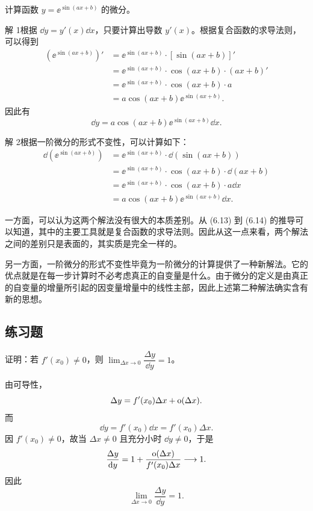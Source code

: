 \begin{xexample}[6.3.3]
计算函数 $y=\ee^{\sin(ax+b)}$ 的微分。
\end{xexample}
\begin{xsolution}
解 1\quad 根据 $\dd y=y'(x)\dd x$，只要计算出导数 $y'(x)$。根据复合函数的求导法则，可以得到
\begin{align*}
  (\ee^{\sin(ax+b)})'
  &=\ee^{\sin(ax+b)}\cdot[\sin(ax+b)]'\\
  &=\ee^{\sin(ax+b)}\cdot\cos(ax+b)\cdot(ax+b)'\\
  &=\ee^{\sin(ax+b)}\cdot\cos(ax+b)\cdot a\\
  &=a\cos(ax+b)\ee^{\sin(ax+b)}.
\end{align*}
因此有
\[
  \dd y=a\cos(ax+b)\ee^{\sin(ax+b)}\dd x.
\]

解 2\quad 根据一阶微分的形式不变性，可以计算如下：
\begin{align*}
  \dd(\ee^{\sin(ax+b)})
  &=\ee^{\sin(ax+b)}\cdot\dd(\sin(ax+b))\\
  &=\ee^{\sin(ax+b)}\cdot\cos(ax+b)\cdot\dd(ax+b)\\
  &=\ee^{\sin(ax+b)}\cdot\cos(ax+b)\cdot a\dd x\\
  &=a\cos(ax+b)\ee^{\sin(ax+b)}\dd x.
\end{align*}
\end{xsolution}

\begin{xremark}
一方面，可以认为这两个解法没有很大的本质差别。从 (6.13) 到 (6.14) 的推导可以知道，其中的主要工具就是复合函数的求导法则。因此从这一点来看，两个解法之间的差别只是表面的，其实质是完全一样的。

另一方面，一阶微分的形式不变性毕竟为一阶微分的计算提供了一种新解法。它的优点就是在每一步计算时不必考虑真正的自变量是什么。由于微分的定义是由真正的自变量的增量所引起的因变量增量中的线性主部，因此上述第二种解法确实含有新的思想。
\end{xremark}

\subsection{练习题}

\begin{xexercise}[1]
证明：若 $f'(x_0)\ne0$，则 $\lim_{\Delta x\to0}\dfrac{\Delta y}{\dd y}=1$。
\end{xexercise}
\begin{xsolution}
由可导性，
\[
  \Delta y=f'(x_0)\Delta x+\mathrm{o}(\Delta x).
\]
而
\[
  \dd y=f'(x_0)\dd x=f'(x_0)\Delta x.
\]
因 $f'(x_0)\ne0$，故当 $\Delta x\ne0$ 且充分小时 $\dd y\ne0$，于是
\[
  \frac{\Delta y}{\mathop{}\!\mathrm{d} y}
  =1+\frac{\mathrm{o}(\Delta x)}{f'(x_0)\Delta x}
  \longrightarrow1.
\]
因此
\[
  \boxed{\lim_{\Delta x\to0}\frac{\Delta y}{\dd y}=1}.
\]
\end{xsolution}


